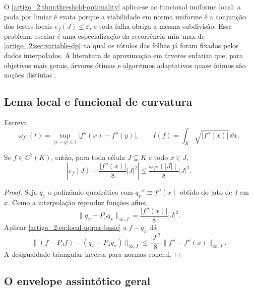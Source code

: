 O \cref{artigo_2:thm:threshold-optimality} aplica-se ao funcional uniforme local: a
poda por limiar é exata porque a
viabilidade em norma uniforme é a conjunção dos testes locais
$e_f(J)\le\varepsilon$, e toda falha obriga a mesma subdivisão. Esse problema
escalar é uma especialização da recorrência min--max de
\cref{artigo_2:sec:variable-dp} na qual os
rótulos das folhas já foram fixados pelos dados interpolados. A literatura de
aproximação em árvores enfatiza que, para objetivos mais gerais, árvores
ótimas e algoritmos adaptativos quase ótimos são noções distintas
\citep{artigo_1-cohen2001,artigo_1-binev2004}.

\subsection{Lema local e funcional de curvatura}

Escreva
\[
 \omega_{f''}(t)=\sup_{|x-y|\le t}|f''(x)-f''(y)|,
 \qquad
 I(f)=\int_K\sqrt{|f''(x)|}\,\dd x.
\]

\begin{lemma}\label{map:artigo_2:11.2}
\label{artigo_2:lem:local-asymptotic-error}
Se $f\in C^2(K)$, então, para toda célula $J\subseteq K$ e todo $x\in J$,
\begin{equation}
 \left|e_f(J)-\frac{|f''(x)|}{8}|J|^2\right|
 \le \frac{\omega_{f''}(|J|)}{8}|J|^2.
 \label{artigo_2:eq:local-asymptotic-error}
\end{equation}
\end{lemma}

\begin{proof}
Seja $q_x$ o polinômio quadrático com $q_x''\equiv f''(x)$ obtido do jato de
$f$ em $x$. Como a interpolação reproduz funções afins,
\[
 \|q_x-P_Jq_x\|_{\infty,J}=\frac{|f''(x)|}{8}|J|^2.
\]
Aplicar \eqref{artigo_2:eq:local-upper-basic} a $f-q_x$ dá
\[
 \|(f-P_Jf)-(q_x-P_Jq_x)\|_{\infty,J}
 \le\frac{|J|^2}{8}\|f''-f''(x)\|_{\infty,J}.
\]
A desigualdade triangular inversa para normas conclui.
\end{proof}

\subsection{O envelope assintótico geral}

